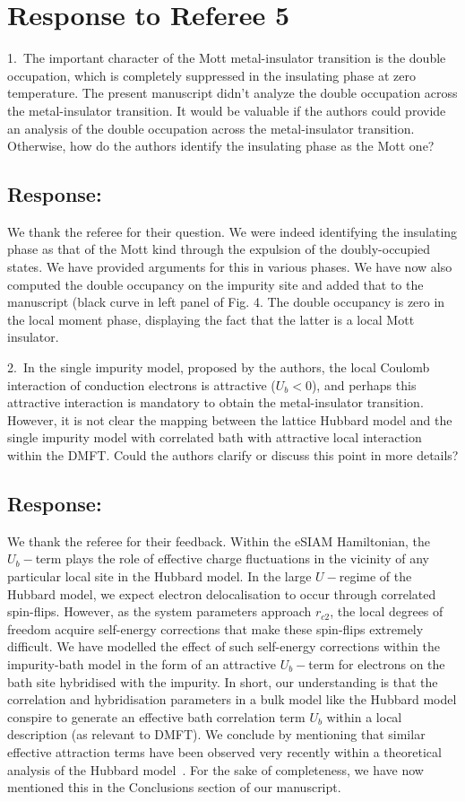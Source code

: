 \documentclass{article}
\newcommand{\response}[1]{{\color{blue}\subsection*{Response:}{#1}\vspace*{10pt}}}
\begin{document}
\section*{Response to Referee 5}
1.~The important character of the Mott metal-insulator transition is the double occupation, which is completely suppressed in the insulating phase at zero temperature.  The present manuscript didn't analyze the double occupation across the metal-insulator transition. It would be valuable if the authors could provide an analysis of the double occupation across the metal-insulator transition. Otherwise, how do the authors identify the insulating phase as the Mott one?

\response{
We thank the referee for their question. We were indeed identifying the insulating phase as that of the Mott kind through the expulsion of the doubly-occupied states. We have provided arguments for this in various phases. We have now also computed the double occupancy on the impurity site and added that to the manuscript (black curve in left panel of Fig. 4. The double occupancy is zero in the local moment phase, displaying the fact that the latter is a local Mott insulator.
}

2.~In the single impurity model, proposed by the authors, the local Coulomb interaction of conduction electrons is attractive ($U_b<0$), and perhaps this attractive interaction is mandatory to obtain the metal-insulator transition. However, it is not clear the mapping between the lattice Hubbard model and the single impurity model with correlated bath with attractive local interaction within the DMFT. Could the authors clarify or discuss this point in more details?

\response{
	We thank the referee for their feedback. Within the eSIAM Hamiltonian, the \(U_b-\)term plays the role of effective charge fluctuations in the vicinity of any particular local site in the Hubbard model. In the large \(U-\)regime of the Hubbard model, we expect electron delocalisation to occur through correlated spin-flips. However, as the system parameters approach \(r_{c2}\), the local degrees of freedom acquire self-energy corrections that make these spin-flips extremely difficult. We have modelled the effect of such self-energy corrections within the impurity-bath model in the form of an attractive \(U_b-\)term for electrons on the bath site hybridised with the impurity. In short, our understanding is that the correlation and hybridisation parameters in a bulk model like the Hubbard model conspire to generate an effective bath correlation term \(U_b\) within a local description (as relevant to DMFT). We conclude by mentioning that similar effective attraction terms have been observed very recently within a theoretical analysis of the Hubbard model~\cite{gazizovaleblanc2023}. For the sake of completeness, we have now mentioned this in the Conclusions section of our manuscript.
}
\end{document}
